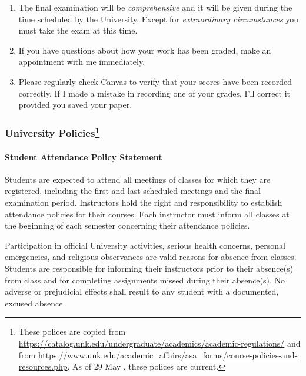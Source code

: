 \documentclass[12pt]{article}
\newcounter{ex}\setcounter{ex}{0}
\begin{document}
\begin{enumerate}
\item The final examination will be \emph{comprehensive} and it will be given 
during the  time scheduled by the University. Except for \emph{extraordinary circumstances}
you must take the exam at this time.
 
\item If you have questions about how your work has been graded, make an appointment with me immediately.


\item Please regularly check Canvas  to verify that your scores have 
been recorded correctly.  If I made a mistake in recording one of
your grades, I'll correct it provided you saved your paper.



\end{enumerate}

















\newpage



\subsubsection*{University Policies\footnote{These polices are
copied from \url{https://catalog.unk.edu/undergraduate/academics/academic-regulations/}
and from \url{https://www.unk.edu/academic_affairs/asa_forms/course-policies-and-resources.php}.
As of 29 May \the\year, these polices are current.}} 
\paragraph*{Student Attendance Policy Statement}

Students are expected to attend all meetings of classes for which they are 
registered, including the first and last scheduled meetings and the final 
examination period. Instructors hold the right and responsibility to 
establish attendance policies for their courses. Each instructor must 
inform all classes at the beginning of each semester concerning their 
attendance policies.

Participation in official University activities, serious health concerns, 
personal emergencies, and religious observances are valid reasons for absence 
from classes. Students are responsible for informing their instructors prior 
to their absence(s) from class and for completing assignments missed during 
their absence(s). No adverse or prejudicial effects shall result to any student 
with a documented, excused absence.  
\end{document}
